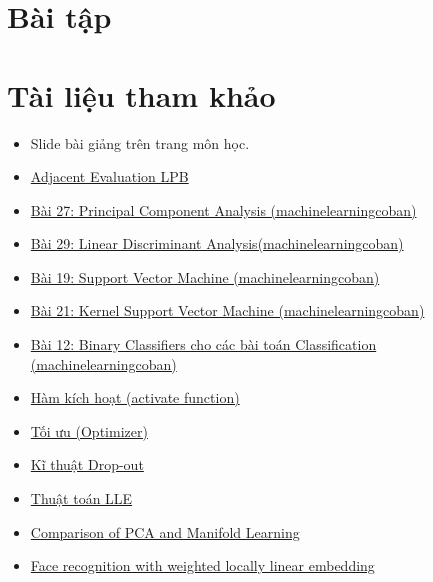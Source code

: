 \documentclass[a4paper, 12pt]{article}
\begin{document}
\section{Bài tập}



\pagebreak

\section{Tài liệu tham khảo}
\begin{itemize}
    \item Slide bài giảng trên trang môn học.
    \item \href{https://www.researchgate.net/publication/283539781_Adjacent_evaluation_of_local_binary_pattern_for_texture_classification}{Adjacent Evaluation LPB}
    \item \href{https://machinelearningcoban.com/2017/06/15/pca/}{Bài 27: Principal Component Analysis (machinelearningcoban)}
    \item \href{https://machinelearningcoban.com/2017/06/30/lda/}{Bài 29: Linear Discriminant Analysis(machinelearningcoban)}
    \item \href{https://machinelearningcoban.com/2017/04/09/smv/}{Bài 19: Support Vector Machine (machinelearningcoban)}
    \item \href{https://machinelearningcoban.com/2017/04/22/kernelsmv/}{Bài 21: Kernel Support Vector Machine (machinelearningcoban)}
    \item \href{https://machinelearningcoban.com/2017/02/11/binaryclassifiers/}{Bài 12: Binary Classifiers cho các bài toán Classification (machinelearningcoban)}
    \item \href{https://aicurious.io/posts/2019-09-23-cac-ham-kich-hoat-activation-function-trong-neural-networks/}{Hàm kích hoạt (activate function)}
    \item \href{https://viblo.asia/p/optimizer-hieu-sau-ve-cac-thuat-toan-toi-uu-gdsgdadam-Qbq5QQ9E5D8}{Tối ưu (Optimizer)}
    \item \href{https://www.phamduytung.com/blog/2019-05-05-deep-learning-dropout/}{Kĩ thuật Drop-out}
    \item \href{https://qastack.vn/stats/82037/explain-steps-of-lle-local-linear-embedding-algorithm}{Thuật toán LLE}
    \item \href{https://www.astroml.org/book_figures/chapter7/fig_S_manifold_PCA.html}{Comparison of PCA and Manifold Learning}
    \item \href{https://ieeexplore.ieee.org/document/1443143}{Face recognition with weighted locally linear embedding}

\end{itemize}
\end{document}
